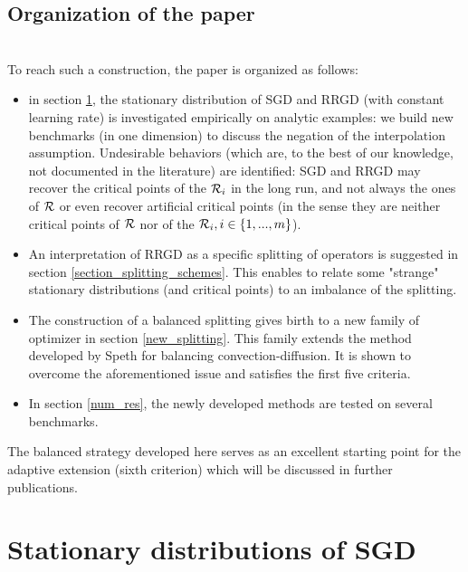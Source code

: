\documentclass[article,authoryear,jmlmc]{beg_32}             %
\begin{document}
\subsection{Organization of the paper}
~~\\
To reach such a construction, the paper is organized as follows:
\begin{itemize}
	\item in section \ref{section_stationary}, the stationary distribution of SGD and RRGD (with constant learning rate) is investigated empirically on analytic examples: we build new benchmarks (in one
          dimension) to discuss the negation of the interpolation assumption. Undesirable behaviors (which are, to the best of our knowledge, not documented in the literature) are
          identified: SGD and RRGD may recover the critical points of the $\mathcal{R}_i$ in the long run, and not always the ones of $\mathcal{R}$ or even recover artificial critical points (in the
          sense they are neither critical points of $\mathcal{R}$ nor of the $\mathcal{R}_i, i\in\{1,...,m\}$). 
        \item An interpretation of RRGD as a specific splitting of operators is suggested in section \ref{section_splitting_schemes}. This enables to relate some "strange"
          stationary distributions (and critical points) to an imbalance of the splitting. 
	\item The construction of a balanced splitting gives birth to a new family of optimizer in section \ref{new_splitting}. This family extends the method developed by Speth \cite{rebalanced_splitting} for balancing convection-diffusion. It is shown to overcome the aforementioned issue and satisfies the first five criteria.
	\item In section \ref{num_res}, the newly developed methods are tested on several benchmarks. 
\end{itemize}
The balanced strategy developed here serves as an excellent starting point for the adaptive extension (sixth criterion) which will be discussed in further publications. 

\section{Stationary distributions of SGD}
\label{section_stationary}
\end{document}
